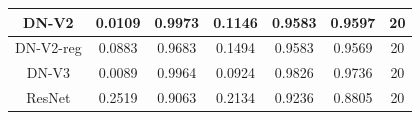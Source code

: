 \documentclass[11pt,a4paper]{article}
\theoremstyle{definition}
\begin{document}
\begin{table}[H]
\begin{tabular}{|c|c|c|c|c|c|c|}
\hline
DN-V2                                               & \textcolor[rgb]{0.129,0.129,0.129}{0.0109 } & \textcolor[rgb]{0.129,0.129,0.129}{0.9973 } & \textcolor[rgb]{0.129,0.129,0.129}{0.1146 }                                                                       & \textcolor[rgb]{0.129,0.129,0.129}{0.9583}                                                                             & \textcolor[rgb]{0.129,0.129,0.129}{0.9597}                                                                       & 20                                                                                                              \\
\hline
DN-V2-reg                                           & \textcolor[rgb]{0.129,0.129,0.129}{0.0883 } & \textcolor[rgb]{0.129,0.129,0.129}{0.9683 } & \textcolor[rgb]{0.129,0.129,0.129}{0.1494 }                                                                       & \textcolor[rgb]{0.129,0.129,0.129}{0.9583}                                                                             & \textcolor[rgb]{0.129,0.129,0.129}{0.9569}                                                                       & 20                                                                                                              \\
\hline
DN-V3                                               & \textcolor[rgb]{0.129,0.129,0.129}{0.0089 } & \textcolor[rgb]{0.129,0.129,0.129}{0.9964 } & \textcolor[rgb]{0.129,0.129,0.129}{0.0924 }                                                                       & \textcolor[rgb]{0.129,0.129,0.129}{0.9826}                                                                             & \textcolor[rgb]{0.129,0.129,0.129}{0.9736}                                                                       & 20                                                                                                              \\
\hline
ResNet                                              & \textcolor[rgb]{0.129,0.129,0.129}{0.2519 } & \textcolor[rgb]{0.129,0.129,0.129}{0.9063 } & \textcolor[rgb]{0.129,0.129,0.129}{0.2134 }                                                                       & \textcolor[rgb]{0.129,0.129,0.129}{0.9236}                                                                             & \textcolor[rgb]{0.129,0.129,0.129}{0.8805}                                                                       & 20                                                                                                              \\

\end{tabular}
\end{table}
\end{document}
